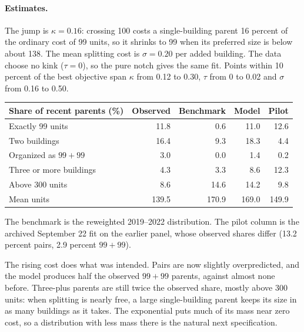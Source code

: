 \paragraph{Estimates.} The jump is $\kappa=0.16$: crossing 100 costs a
single-building parent 16 percent of the ordinary cost of 99 units, so it
shrinks to 99 when its preferred size is below about 138. The mean splitting
cost is $\sigma=0.20$ per added building. The data choose no kink ($\tau=0$),
so the pure notch gives the same fit. Points within 10 percent of the best
objective span $\kappa$ from 0.12 to 0.30, $\tau$ from 0 to 0.02 and $\sigma$
from 0.16 to 0.50.

\begin{center}
\small
\begin{tabular}{lrrrr}
\hline
Share of recent parents (\%) & Observed & Benchmark & Model & Pilot \\
\hline
Exactly 99 units & 11.8 & 0.6 & 11.0 & 12.6 \\
Two buildings & 16.4 & 9.3 & 18.3 & 4.4 \\
Organized as $99+99$ & 3.0 & 0.0 & 1.4 & 0.2 \\
Three or more buildings & 4.3 & 3.3 & 8.6 & 12.3 \\
Above 300 units & 8.6 & 14.6 & 14.2 & 9.8 \\
Mean units & 139.5 & 170.9 & 169.0 & 149.9 \\
\hline
\end{tabular}
\end{center}

The benchmark is the reweighted 2019--2022 distribution. The pilot column is
the archived September 22 fit on the earlier panel, whose observed shares
differ (13.2 percent pairs, 2.9 percent $99+99$).

The rising cost does what was intended. Pairs are now slightly
overpredicted, and the model produces half the observed $99+99$ parents,
against almost none before. Three-plus parents are still twice the observed
share, mostly above 300 units: when splitting is nearly free, a large
single-building parent keeps its size in as many buildings as it takes. The
exponential puts much of its mass near zero cost, so a distribution with less
mass there is the natural next specification.

